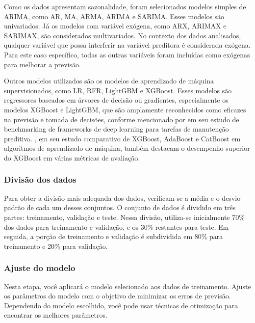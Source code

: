 Como os dados apresentam sazonalidade, foram selecionados modelos simples de ARIMA, como AR, MA, ARMA, ARIMA e SARIMA. Esses modelos são univariados. Já os modelos com variável exógena, como ARX, ARIMAX e SARIMAX, são considerados multivariados. No contexto dos dados analisados, qualquer variável que possa interferir na variável preditora é considerada exógena. Para este caso específico, todas as outras variáveis foram incluídas como exógenas para melhorar a previsão.

Outros modelos utilizados são os modelos de aprendizado de máquina supervisionados, como LR, RFR, LightGBM e XGBoost. Esses modelos são regressores baseados em árvores de decisão ou gradientes, especialmente os modelos XGBoost e LightGBM, que são amplamente reconhecidos como eficazes na previsão e tomada de decisões, conforme mencionado por  em seu estudo de benchmarking de frameworks de deep learning para tarefas de manutenção preditiva. , em seu estudo comparativo de XGBoost, AdaBoost e CatBoost em algoritmos de aprendizado de máquina, também destacam o desempenho superior do XGBoost em várias métricas de avaliação.



\subsubsection{Divis\~ao dos dados}

Para obter a divisão mais adequada dos dados, verificam-se a média e o desvio padrão de cada um desses conjuntos. O conjunto de dados é dividido em três partes: treinamento, validação e teste. Nessa divisão, utiliza-se inicialmente 70\% dos dados para treinamento e validação, e os 30\% restantes para teste. Em seguida, a porção de treinamento e validação é subdividida em 80\% para treinamento e 20\% para validação.

\subsubsection{Ajuste do modelo}
Nesta etapa, você aplicará o modelo selecionado aos dados de treinamento. Ajuste os parâmetros do modelo com o objetivo de minimizar os erros de previsão. Dependendo do modelo escolhido, você pode usar técnicas de otimização para encontrar os melhores parâmetros.

